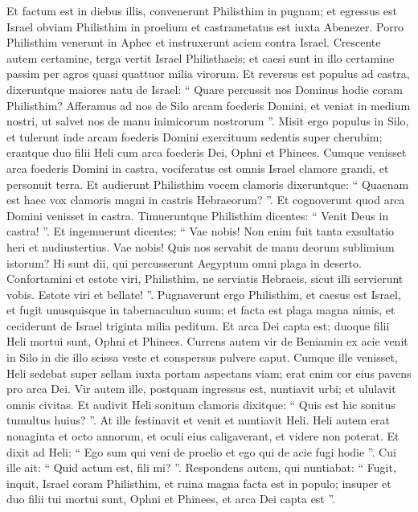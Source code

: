 \begin{biblechapter}
\begin{biblechapter}
\begin{biblechapter}
\begin{biblechapter}
\verse Et factum est in diebus illis, convenerunt Philisthim in pugnam; et egressus est Israel obviam Philisthim in proelium et castrametatus est iuxta Abenezer. Porro Philisthim venerunt in Aphec 
\verse et instruxerunt aciem contra Israel. Crescente autem certamine, terga vertit Israel Philisthaeis; et caesi sunt in illo certamine passim per agros quasi quattuor milia virorum.
 \verse Et reversus est populus ad castra, dixeruntque maiores natu de Israel: “ Quare percussit nos Dominus hodie coram Philisthim? Afferamus ad nos de Silo arcam foederis Domini, et veniat in medium nostri, ut salvet nos de manu inimicorum nostrorum ”. 
\verse Misit ergo populus in Silo, et tulerunt inde arcam foederis Domini exercituum sedentis super cherubim; erantque duo filii Heli cum arca foederis Dei, Ophni et Phinees.
 \verse Cumque venisset arca foederis Domini in castra, vociferatus est omnis Israel clamore grandi, et personuit terra. 
\verse Et audierunt Philisthim vocem clamoris dixeruntque: “ Quaenam est haec vox clamoris magni in castris Hebraeorum? ”. Et cognoverunt quod arca Domini venisset in castra. 
\verse Timueruntque Philisthim dicentes: “ Venit Deus in castra! ”. Et ingemuerunt dicentes: 
\verse “ Vae nobis! Non enim fuit tanta exsultatio heri et nudiustertius. Vae nobis! Quis nos servabit de manu deorum sublimium istorum? Hi sunt dii, qui percusserunt Aegyptum omni plaga in deserto. 
\verse Confortamini et estote viri, Philisthim, ne serviatis Hebraeis, sicut illi servierunt vobis. Estote viri et bellate! ”.
 \verse Pugnaverunt ergo Philisthim, et caesus est Israel, et fugit unusquisque in tabernaculum suum; et facta est plaga magna nimis, et ceciderunt de Israel triginta milia peditum. 
\verse Et arca Dei capta est; duoque filii Heli mortui sunt, Ophni et Phinees.
 \verse Currens autem vir de Beniamin ex acie venit in Silo in die illo scissa veste et conspersus pulvere caput. 
\verse Cumque ille venisset, Heli sedebat super sellam iuxta portam aspectans viam; erat enim cor eius pavens pro arca Dei. Vir autem ille, postquam ingressus est, nuntiavit urbi; et ululavit omnis civitas. 
 \verse Et audivit Heli sonitum clamoris dixitque: “ Quis est hic sonitus tumultus huius? ”. At ille festinavit et venit et nuntiavit Heli. 
\verse Heli autem erat nonaginta et octo annorum, et oculi eius caligaverant, et videre non poterat. 
 \verse Et dixit ad Heli: “ Ego sum qui veni de proelio et ego qui de acie fugi hodie ”. Cui ille ait: “ Quid actum est, fili mi? ”. 
\verse Respondens autem, qui nuntiabat: “ Fugit, inquit, Israel coram Philisthim, et ruina magna facta est in populo; insuper et duo filii tui mortui sunt, Ophni et Phinees, et arca Dei capta est ”.

\end{biblechapter}
\end{biblechapter}
\end{biblechapter}
\end{biblechapter}
